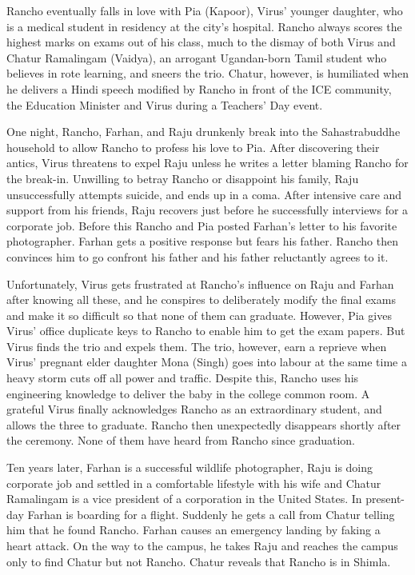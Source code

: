 \documentclass{article}
\begin{document}
Rancho eventually falls in love with Pia (Kapoor), Virus' younger daughter, who is a medical student in residency at the city's hospital. Rancho always scores the highest marks on exams out of his class, much to the dismay of both Virus and Chatur Ramalingam (Vaidya), an arrogant Ugandan-born Tamil student who believes in rote learning, and sneers the trio. Chatur, however, is humiliated when he delivers a Hindi speech modified by Rancho in front of the ICE community, the Education Minister and Virus during a Teachers' Day event.

One night, Rancho, Farhan, and Raju drunkenly break into the Sahastrabuddhe household to allow Rancho to profess his love to Pia. After discovering their antics, Virus threatens to expel Raju unless he writes a letter blaming Rancho for the break-in. Unwilling to betray Rancho or disappoint his family, Raju unsuccessfully attempts suicide, and ends up in a coma. After intensive care and support from his friends, Raju recovers just before he successfully interviews for a corporate job. Before this Rancho and Pia posted Farhan's letter to his favorite photographer. Farhan gets a positive response but fears his father. Rancho then convinces him to go confront his father and his father reluctantly agrees to it.

Unfortunately, Virus gets frustrated at Rancho's influence on Raju and Farhan after knowing all these, and he conspires to deliberately modify the final exams and make it so difficult so that none of them can graduate. However, Pia gives Virus' office duplicate keys to Rancho to enable him to get the exam papers. But Virus finds the trio and expels them. The trio, however, earn a reprieve when Virus' pregnant elder daughter Mona (Singh) goes into labour at the same time a heavy storm cuts off all power and traffic. Despite this, Rancho uses his engineering knowledge to deliver the baby in the college common room. A grateful Virus finally acknowledges Rancho as an extraordinary student, and allows the three to graduate. Rancho then unexpectedly disappears shortly after the ceremony. None of them have heard from Rancho since graduation.

Ten years later, Farhan is a successful wildlife photographer, Raju is doing corporate job and settled in a comfortable lifestyle with his wife and Chatur Ramalingam is a vice president of a corporation in the United States. In present-day Farhan is boarding for a flight. Suddenly he gets a call from Chatur telling him that he found Rancho. Farhan causes an emergency landing by faking a heart attack. On the way to the campus, he takes Raju and reaches the campus only to find Chatur but not Rancho. Chatur reveals that Rancho is in Shimla.
\end{document}
